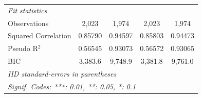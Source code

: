 \begin{table}[htbp]
\begin{tabular}{lcccc}
      \midrule
      \emph{Fit statistics}\\
      Observations                   & 2,023         & 1,974          & 2,023         & 1,974\\  
      Squared Correlation            & 0.85790       & 0.94597        & 0.85803       & 0.94473\\  
      Pseudo R$^2$                   & 0.56545       & 0.93073        & 0.56572       & 0.93065\\  
      BIC                            & 3,383.6       & 9,748.9        & 3,381.8       & 9,761.0\\  
      \midrule \midrule
      \multicolumn{5}{l}{\emph{IID standard-errors in parentheses}}\\
      \multicolumn{5}{l}{\emph{Signif. Codes: ***: 0.01, **: 0.05, *: 0.1}}\\
   \end{tabular}
\end{table}


